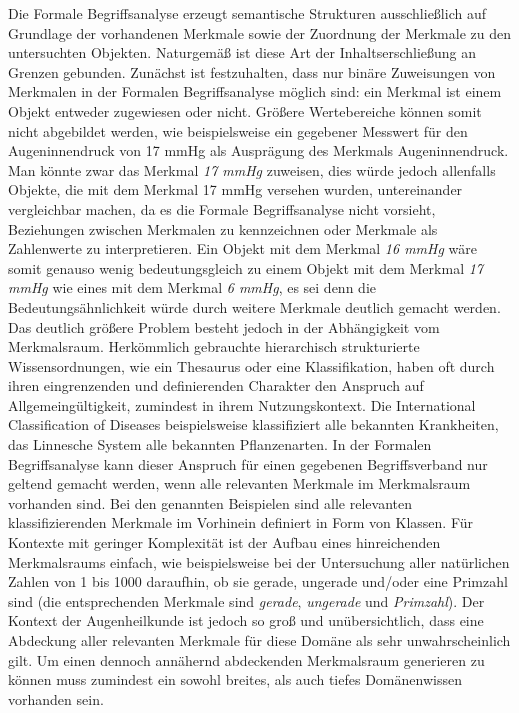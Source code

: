 \documentclass[pagesize,DIV=calc,12pt,draft]{scrreprt}
\begin{document}
Die Formale Begriffsanalyse erzeugt semantische Strukturen ausschließlich auf Grundlage der vorhandenen Merkmale sowie der Zuordnung der Merkmale zu den untersuchten Objekten. 
Naturgemäß ist diese Art der Inhaltserschließung an Grenzen gebunden. 
Zunächst ist festzuhalten, dass nur binäre Zuweisungen von Merkmalen in der Formalen Begriffsanalyse möglich sind: ein Merkmal ist einem Objekt entweder zugewiesen oder nicht. 
Größere Wertebereiche können somit nicht abgebildet werden, wie beispielsweise ein gegebener Messwert für den Augeninnendruck von 17 mmHg als Ausprägung des Merkmals Augeninnendruck. 
Man könnte zwar das Merkmal \emph{17 mmHg} zuweisen, dies würde jedoch allenfalls Objekte, die mit dem Merkmal 17 mmHg versehen wurden, untereinander vergleichbar machen, da es die Formale Begriffsanalyse nicht vorsieht, Beziehungen zwischen Merkmalen zu kennzeichnen oder Merkmale als Zahlenwerte zu interpretieren. 
Ein Objekt mit dem Merkmal \emph{16 mmHg} wäre somit genauso wenig bedeutungsgleich zu einem Objekt mit dem Merkmal \emph{17 mmHg} wie eines mit dem Merkmal \emph{6 mmHg}, es sei denn die Bedeutungsähnlichkeit würde durch weitere Merkmale deutlich gemacht werden. 
Das deutlich größere Problem besteht jedoch in der Abhängigkeit vom Merkmalsraum. 
Herkömmlich gebrauchte hierarchisch strukturierte Wissensordnungen, wie ein Thesaurus oder eine Klassifikation, haben oft durch ihren eingrenzenden und definierenden Charakter den Anspruch auf Allgemeingültigkeit, zumindest in ihrem Nutzungskontext. 
Die International Classification of Diseases beispielsweise klassifiziert alle bekannten Krankheiten, das Linnesche System alle bekannten Pflanzenarten. 
In der Formalen Begriffsanalyse kann dieser Anspruch für einen gegebenen Begriffsverband nur geltend gemacht werden, wenn alle relevanten Merkmale im Merkmalsraum vorhanden sind. 
Bei den genannten Beispielen sind alle relevanten klassifizierenden Merkmale im Vorhinein definiert in Form von Klassen. 
Für Kontexte mit geringer Komplexität ist der Aufbau eines hinreichenden Merkmalsraums einfach, wie beispielsweise bei der Untersuchung aller natürlichen Zahlen von 1 bis 1000 daraufhin, ob sie gerade, ungerade und/oder eine Primzahl sind (die entsprechenden Merkmale sind \emph{gerade}, \emph{ungerade} und \emph{Primzahl}).
Der Kontext der Augenheilkunde ist jedoch so groß und unübersichtlich, dass eine Abdeckung aller relevanten Merkmale für diese Domäne als sehr unwahrscheinlich gilt. 
Um einen dennoch annähernd abdeckenden Merkmalsraum generieren zu können muss zumindest ein sowohl breites, als auch tiefes Domänenwissen vorhanden sein. 
\end{document}
